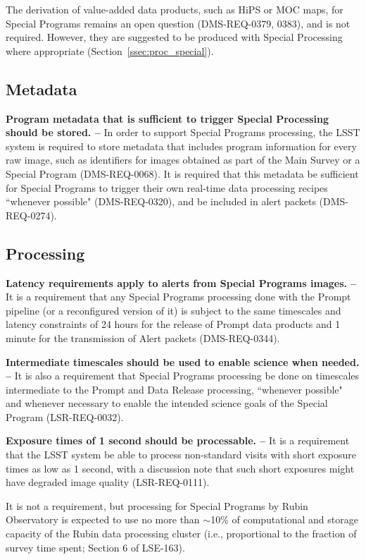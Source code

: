The derivation of value-added data products, such as HiPS or MOC maps, for 
Special Programs remains an open question (DMS-REQ-0379, 0383), and is not required.
However, they are suggested to be produced with Special Processing where
appropriate (Section~\ref{ssec:proc_special}).


\subsection{Metadata}\label{ssec:req_meta}

\textbf{Program metadata that is sufficient to trigger Special Processing should be stored. -- }
In order to support Special Programs processing, the LSST system is 
required to store metadata that includes program information for every raw 
image, such as identifiers for images obtained as part of the Main Survey 
or a Special Program (DMS-REQ-0068).
It is required that this metadata be sufficient for Special Programs to 
trigger their own real-time data processing recipes ``whenever possible" 
(DMS-REQ-0320), and be included in alert packets (DMS-REQ-0274).


\subsection{Processing}\label{ssec:req_proc}

\textbf{Latency requirements apply to alerts from Special Programs images. --}
It is a requirement that any Special Programs processing done with the 
Prompt pipeline (or a reconfigured version of it) is subject to the same 
timescales and latency constraints of 24 hours for the release of Prompt 
data products and 1 minute for the transmission of Alert packets 
(DMS-REQ-0344).

\textbf{Intermediate timescales should be used to enable science when needed. --}
It is also a requirement that Special Programs processing be done on 
timescales intermediate to the Prompt and Data Release processing, 
``whenever possible" and whenever necessary to enable the intended science 
goals of the Special Program (LSR-REQ-0032).

\textbf{Exposure times of 1 second should be processable. -- }
It is a requirement that the LSST system be able to process non-standard 
visits with short exposure times as low as 1 second, with a discussion 
note that such short exposures might have degraded image quality 
(LSR-REQ-0111).

It is not a requirement, but processing for Special Programs by Rubin Observatory is expected to use no 
more than $\sim$10\% of computational and storage capacity of the Rubin data processing cluster 
(i.e., proportional to the fraction of survey time spent; Section 6 of LSE-163).


